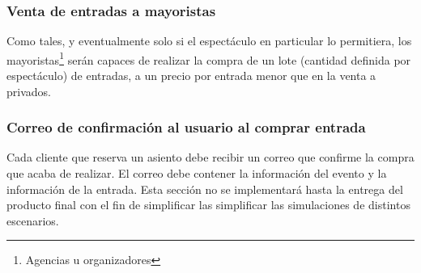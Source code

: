 \subsubsection{Venta de entradas a mayoristas}

Como tales, y eventualmente solo si el espectáculo en particular lo permitiera, los mayoristas\footnote{Agencias u organizadores} serán
capaces de realizar la compra de un lote (cantidad definida por espectáculo) de entradas,
a un precio por entrada menor que en la venta a privados.

\subsubsection{Correo de confirmación al usuario al comprar entrada}

Cada cliente que reserva un asiento debe recibir un correo que confirme la compra que acaba de realizar. 
El correo debe contener la información del evento y la información de la entrada.
Esta sección no se implementará hasta la entrega del producto final con el fin de simplificar las simplificar
las simulaciones de distintos escenarios.